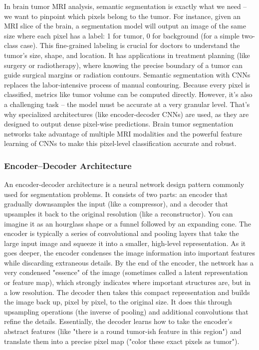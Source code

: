 In brain tumor MRI analysis, semantic segmentation is exactly what we need – we want to pinpoint which pixels belong to the tumor. For instance, given an MRI slice of the brain, a segmentation model will output an image of the same size where each pixel has a label: 1 for tumor, 0 for background (for a simple two-class case). This fine-grained labeling is crucial for doctors to understand the tumor's size, shape, and location. It has applications in treatment planning (like surgery or radiotherapy), where knowing the precise boundary of a tumor can guide surgical margins or radiation contours. Semantic segmentation with CNNs replaces the labor-intensive process of manual contouring. Because every pixel is classified, metrics like tumor volume can be computed directly. However, it's also a challenging task – the model must be accurate at a very granular level. That's why specialized architectures (like encoder-decoder CNNs) are used, as they are designed to output dense pixel-wise predictions. Brain tumor segmentation networks take advantage of multiple MRI modalities and the powerful feature learning of CNNs to make this pixel-level classification accurate and robust.

\subsubsection{Encoder–Decoder Architecture}
\label{sec:encoder_decoder_arch}

An encoder-decoder architecture is a neural network design pattern commonly used for segmentation problems. It consists of two parts: an encoder that gradually downsamples the input (like a compressor), and a decoder that upsamples it back to the original resolution (like a reconstructor). You can imagine it as an hourglass shape or a funnel followed by an expanding cone. The encoder is typically a series of convolutional and pooling layers that take the large input image and squeeze it into a smaller, high-level representation. As it goes deeper, the encoder condenses the image information into important features while discarding extraneous details. By the end of the encoder, the network has a very condensed "essence" of the image (sometimes called a latent representation or feature map), which strongly indicates where important structures are, but in a low resolution. The decoder then takes this compact representation and builds the image back up, pixel by pixel, to the original size. It does this through upsampling operations (the inverse of pooling) and additional convolutions that refine the details. Essentially, the decoder learns how to take the encoder's abstract features (like "there is a round tumor-ish feature in this region") and translate them into a precise pixel map ("color these exact pixels as tumor").

